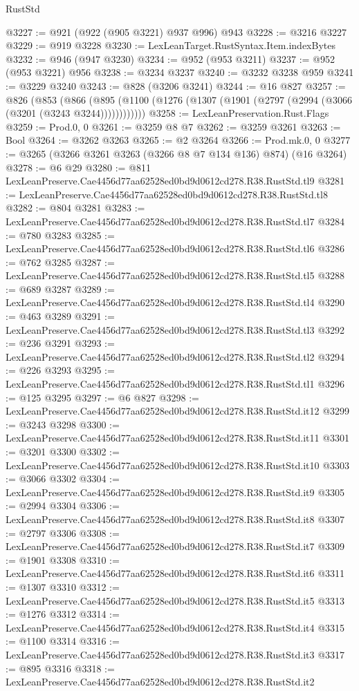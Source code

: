 \begin{lexlean}{RustStd}
\begin{coremodule}
@3227 := @921 (@922 (@905 @3221) @937 @996) @943
@3228 := @3216 @3227
@3229 := @919 @3228
@3230 := LexLeanTarget.RustSyntax.Item.indexBytes
@3232 := @946 (@947 @3230)
@3234 := @952 (@953 @3211)
@3237 := @952 (@953 @3221) @956
@3238 := @3234 @3237
@3240 := @3232 @3238 @959
@3241 := @3229 @3240
@3243 := @828 (@3206 @3241)
@3244 := @16 @827
@3257 := @826
    (@853
      (@866 (@895 (@1100 (@1276 (@1307 (@1901 (@2797 (@2994 (@3066 (@3201 (@3243 @3244))))))))))))
@3258 := LexLeanPreservation.Rust.Flags
@3259 := Prod.{0, 0}
@3261 := @3259 @8 @7
@3262 := @3259 @3261
@3263 := Bool
@3264 := @3262 @3263
@3265 := @2 @3264
@3266 := Prod.mk.{0, 0}
@3277 := @3265 (@3266 @3261 @3263 (@3266 @8 @7 @134 @136) @874) (@16 @3264)
@3278 := @6 @29
@3280 := @811 LexLeanPreserve.Cae4456d77aa62528ed0bd9d0612cd278.R38.RustStd.tl9
@3281 := LexLeanPreserve.Cae4456d77aa62528ed0bd9d0612cd278.R38.RustStd.tl8
@3282 := @804 @3281
@3283 := LexLeanPreserve.Cae4456d77aa62528ed0bd9d0612cd278.R38.RustStd.tl7
@3284 := @780 @3283
@3285 := LexLeanPreserve.Cae4456d77aa62528ed0bd9d0612cd278.R38.RustStd.tl6
@3286 := @762 @3285
@3287 := LexLeanPreserve.Cae4456d77aa62528ed0bd9d0612cd278.R38.RustStd.tl5
@3288 := @689 @3287
@3289 := LexLeanPreserve.Cae4456d77aa62528ed0bd9d0612cd278.R38.RustStd.tl4
@3290 := @463 @3289
@3291 := LexLeanPreserve.Cae4456d77aa62528ed0bd9d0612cd278.R38.RustStd.tl3
@3292 := @236 @3291
@3293 := LexLeanPreserve.Cae4456d77aa62528ed0bd9d0612cd278.R38.RustStd.tl2
@3294 := @226 @3293
@3295 := LexLeanPreserve.Cae4456d77aa62528ed0bd9d0612cd278.R38.RustStd.tl1
@3296 := @125 @3295
@3297 := @6 @827
@3298 := LexLeanPreserve.Cae4456d77aa62528ed0bd9d0612cd278.R38.RustStd.it12
@3299 := @3243 @3298
@3300 := LexLeanPreserve.Cae4456d77aa62528ed0bd9d0612cd278.R38.RustStd.it11
@3301 := @3201 @3300
@3302 := LexLeanPreserve.Cae4456d77aa62528ed0bd9d0612cd278.R38.RustStd.it10
@3303 := @3066 @3302
@3304 := LexLeanPreserve.Cae4456d77aa62528ed0bd9d0612cd278.R38.RustStd.it9
@3305 := @2994 @3304
@3306 := LexLeanPreserve.Cae4456d77aa62528ed0bd9d0612cd278.R38.RustStd.it8
@3307 := @2797 @3306
@3308 := LexLeanPreserve.Cae4456d77aa62528ed0bd9d0612cd278.R38.RustStd.it7
@3309 := @1901 @3308
@3310 := LexLeanPreserve.Cae4456d77aa62528ed0bd9d0612cd278.R38.RustStd.it6
@3311 := @1307 @3310
@3312 := LexLeanPreserve.Cae4456d77aa62528ed0bd9d0612cd278.R38.RustStd.it5
@3313 := @1276 @3312
@3314 := LexLeanPreserve.Cae4456d77aa62528ed0bd9d0612cd278.R38.RustStd.it4
@3315 := @1100 @3314
@3316 := LexLeanPreserve.Cae4456d77aa62528ed0bd9d0612cd278.R38.RustStd.it3
@3317 := @895 @3316
@3318 := LexLeanPreserve.Cae4456d77aa62528ed0bd9d0612cd278.R38.RustStd.it2

\end{coremodule}
\end{lexlean}
